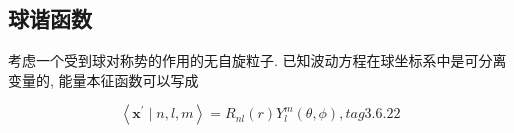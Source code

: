 %
%
%
%
%
%
%
%
%
%
\subsection{球谐函数}
考虑一个受到球对称势的作用的无自旋粒子. 已知波动方程在球坐标系中是可分离变量的, 能量本征函数可以写成

$$
\left\langle {{\mathbf{x}}^{\prime } \mid n, l, m}\right\rangle = {R}_{nl}\left( r\right) {Y}_{l}^{m}\left( {\theta ,\phi }\right) , tag{3. 6.22}
$$

